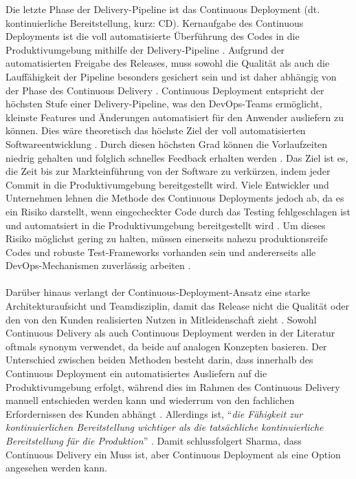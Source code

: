 Die letzte Phase der Delivery-Pipeline ist das Continuous Deployment (dt. kontinuierliche Bereitstellung, kurz: CD). Kernaufgabe des Continuous Deployments ist die voll automatisierte Überführung des Codes in die Produktivumgebung mithilfe der Delivery-Pipeline \cite[S. 29]{alt_innovationsorientiertes_2017}. Aufgrund der automatisierten Freigabe des Releases, muss sowohl die Qualität als auch die Lauffähigkeit der Pipeline besonders gesichert sein und ist daher abhängig von der Phase des Continuous Delivery \cite[S. 269]{tiemeyer_handbuch_2021}. Continuous Deployment entspricht der höchsten Stufe einer Delivery-Pipeline, was den DevOps-Teams ermöglicht, kleinste Features und Änderungen automatisiert für den Anwender ausliefern zu können. Dies wäre theoretisch das höchste Ziel der voll automatisierten Softwareentwicklung \cite{humble_why_2011}. Durch diesen höchsten Grad können die Vorlaufzeiten niedrig gehalten und folglich schnelles Feedback erhalten werden \cite{humble_why_2011}. Das Ziel ist es, die Zeit bis zur Markteinführung von der Software zu verkürzen, indem jeder Commit in die Produktivumgebung bereitgestellt wird. Viele Entwickler und Unternehmen lehnen die Methode des Continuous Deployments jedoch ab, da es ein Risiko darstellt, wenn eingecheckter Code durch das Testing fehlgeschlagen ist und automatsiert in die Produktivumgebung bereitgestellt wird \cite[S. 269]{tiemeyer_handbuch_2021}. Um dieses Risiko möglichst gering zu halten, müssen einerseits nahezu produktionsreife Codes und robuste Test-Frameworks vorhanden sein und andererseits alle DevOps-Mechanismen zuverlässig arbeiten \cite[S. 269]{tiemeyer_handbuch_2021}.\\\\  Darüber hinaus verlangt der Continuous-Deployment-Ansatz eine starke Architekturaufsicht und Teamdisziplin, damit das Release nicht die Qualität oder den von den Kunden realisierten Nutzen in Mitleidenschaft zieht \cite[S. 119 - 120]{erder_continuous_2016}. Sowohl Continuous Delivery als auch Continuous Deployment werden in der Literatur oftmals synonym verwendet, da beide auf analogen Konzepten basieren. Der Unterschied zwischen beiden Methoden besteht darin, dass innerhalb des Continuous Deployment ein automatisiertes Ausliefern auf die Produktivumgebung erfolgt, während dies im Rahmen des Continuous Delivery manuell entschieden werden kann und wiederrum von den fachlichen Erfordernissen des Kunden abhängt \cite[S. 29 - 30]{alt_innovationsorientiertes_2017}. Allerdings ist, "`\textit{die Fähigkeit zur kontinuierlichen Bereitstellung wichtiger als die tatsächliche kontinuierliche Bereitstellung für die Produktion}"' \cite[S. 19]{sharma_devops_2017}. Damit schlussfolgert Sharma, dass Continuous Delivery ein Muss ist, aber Continuous Deployment als eine Option angesehen werden kann.  


